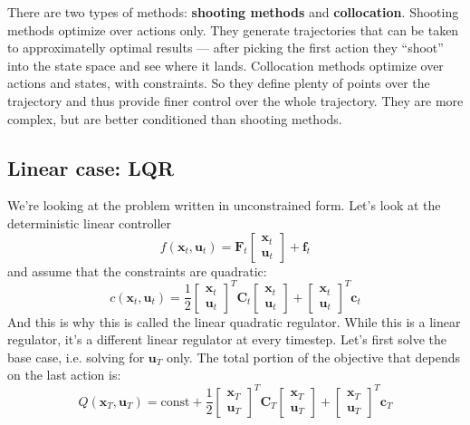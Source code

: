 \documentclass{report}
\begin{document}
There are two types of methods:
\textbf{shooting methods} and \textbf{collocation}.
Shooting methods optimize over actions only. They generate 
trajectories that can be taken to approximatelly optimal results ---
after picking the first action they ``shoot'' into the state space and see where it lands.
Collocation methods optimize over actions and states, with constraints.
So they define plenty of points over the trajectory and thus provide finer control
over the whole trajectory.
They are more complex, but are better conditioned than shooting methods.

\subsection{Linear case: LQR}
We're looking at the problem written in unconstrained form.
Let's look at the deterministic linear controller
\begin{equation}
f (\bm{x}_{t}, \bm{u}_{t} ) = \bm{F}_{t} \begin{bmatrix} \bm{x}_{t} \\ \bm{u}_{t} \end{bmatrix} + \bm{f}_{t}
\end{equation}
and assume that the constraints are quadratic:
\begin{equation}
c (\bm{x}_{t}, \bm{u}_{t} ) = \frac{1}{2} \begin{bmatrix} \bm{x}_{t} \\ \bm{u}_{t} \end{bmatrix}^{ T } 
\bm{C}_{t} \begin{bmatrix} \bm{x}_{t} \\ \bm{u}_{t} \end{bmatrix} + \begin{bmatrix} \bm{x}_{t} \\ \bm{u}_{t} \end{bmatrix}^{ T } \bm{c}_{t}
\end{equation}
And this is why this is called the linear quadratic regulator.
While this is a linear regulator, it's a different linear regulator at every timestep.
Let's first solve the base case, i.e. solving for $ \bm{u}_{T}  $ only.
The total portion of the objective that depends on the last action is:
\begin{equation}
		Q (\bm{x}_{T}, \bm{u}_{T} ) = \text{const} + \frac{1}{2} \begin{bmatrix} \bm{x}_{T} \\ \bm{u}_{T} \end{bmatrix}^{ T } 
\bm{C}_{T} \begin{bmatrix} \bm{x}_{T} \\ \bm{u}_{T} \end{bmatrix} + \begin{bmatrix} \bm{x}_{T} \\ \bm{u}_{T} \end{bmatrix}^{ T } \bm{c}_{T}
\end{equation}
\end{document}

